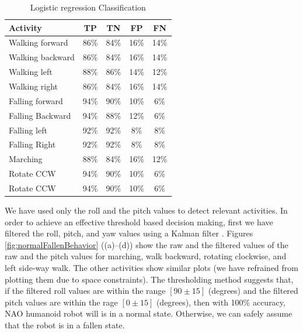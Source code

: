 \documentclass[letterpaper]{article}
\begin{document}
\begin{table}[!ht]
\caption{Logistic regression Classification}
	\label{tab:robot-logistic-class}
	\centering
		\begin{tabular} {| l | c | c | c| c|}
		\hline
			{\bf Activity} & {\bf  TP}  &	{\bf TN}  &	{\bf FP} &	{\bf FN} \\ 
\hline
			Walking forward	& 86\%	& 84\%	& 16\%	& 14\% \\ \hline
			Walking backward	& 86\%	& 84\%	& 16\%	& 14\% \\ \hline
			Walking left 	& 88\%	& 86\%	& 14\%	& 12\% \\ \hline
			Walking right 	& 86\%	& 84\%	& 16\%	& 14\% \\ \hline
			Falling forward	& 94\%	& 90\%	& 10\%	& 6\%	 \\ \hline
			Falling Backward	& 94\%	& 88\%	& 12\%	& 6\%	 \\ \hline
			Falling left	& 92\%	& 92\%	& 8\%	& 8\%	 \\ \hline
			Falling Right	& 92\%	& 92\%	& 8\%	& 8\%	 \\ \hline
			Marching	& 88\%	& 84\%	& 16\%	& 12\%	 \\ \hline
			Rotate CCW	& 94\%	& 90\%	& 10\%	& 6\%	 \\ \hline
			Rotate CCW	& 94\%	& 90\%	& 10\%	& 6\%	 \\ \hline
		\end{tabular}
\end{table}


We have used only the roll and the pitch values  to detect relevant activities. In order to achieve 
an effective threshold based decision making, first we have filtered the roll, pitch, and
yaw values using a Kalman filter \cite{Welch:1995:IKF:897831}. Figures 
\ref{fig:normalFallenBehavior} ((a)--(d)) show
the raw and the filtered values of the raw and the pitch values for marching, walk backward,
rotating clockwise, and left side-way walk. The other activities show similar plots (we have 
refrained from plotting them due to space constraints). The thresholding method
suggests that, if the filtered roll values are within the range $[90\pm15]$ (degrees) and the
filtered pitch values are within the rage $[0\pm15]$ (degrees), then with 100\% accuracy, NAO 
humanoid robot will is in a normal state. Otherwise, we can safely assume that the robot is in 
a fallen state.   
\end{document}
